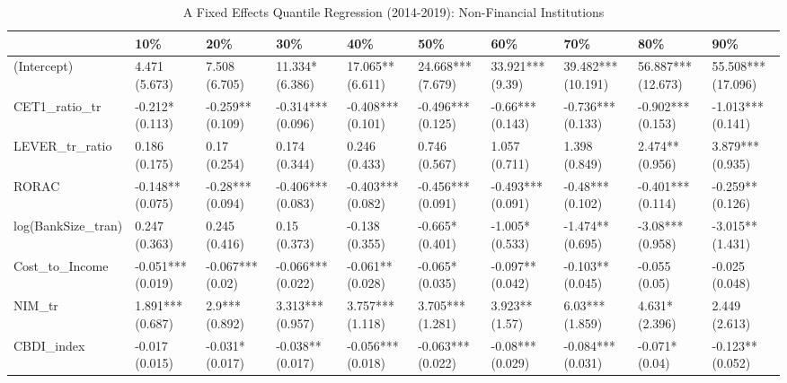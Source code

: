 \begin{table}[ht]
\centering
\caption{A Fixed Effects Quantile Regression (2014-2019): Non-Financial Institutions} 
\begingroup\small
\begin{tabular}{llllllllll}
  \toprule
 & 10\% & 20\% & 30\% & 40\% & 50\% & 60\% & 70\% & 80\% & 90\% \\ 
  \midrule
(Intercept) & 4.471 (5.673) & 7.508 (6.705) & 11.334* (6.386) & 17.065** (6.611) & 24.668*** (7.679) & 33.921*** (9.39) & 39.482*** (10.191) & 56.887*** (12.673) & 55.508*** (17.096) \\ 
  CET1\_ratio\_tr & -0.212* (0.113) & -0.259** (0.109) & -0.314*** (0.096) & -0.408*** (0.101) & -0.496*** (0.125) & -0.66*** (0.143) & -0.736*** (0.133) & -0.902*** (0.153) & -1.013*** (0.141) \\ 
  LEVER\_tr\_ratio & 0.186 (0.175) & 0.17 (0.254) & 0.174 (0.344) & 0.246 (0.433) & 0.746 (0.567) & 1.057 (0.711) & 1.398 (0.849) & 2.474** (0.956) & 3.879*** (0.935) \\ 
  RORAC & -0.148** (0.075) & -0.28*** (0.094) & -0.406*** (0.083) & -0.403*** (0.082) & -0.456*** (0.091) & -0.493*** (0.091) & -0.48*** (0.102) & -0.401*** (0.114) & -0.259** (0.126) \\ 
  log(BankSize\_tran) & 0.247 (0.363) & 0.245 (0.416) & 0.15 (0.373) & -0.138 (0.355) & -0.665* (0.401) & -1.005* (0.533) & -1.474** (0.695) & -3.08*** (0.958) & -3.015** (1.431) \\ 
  Cost\_to\_Income & -0.051*** (0.019) & -0.067*** (0.02) & -0.066*** (0.022) & -0.061** (0.028) & -0.065* (0.035) & -0.097** (0.042) & -0.103** (0.045) & -0.055 (0.05) & -0.025 (0.048) \\ 
  NIM\_tr & 1.891*** (0.687) & 2.9*** (0.892) & 3.313*** (0.957) & 3.757*** (1.118) & 3.705*** (1.281) & 3.923** (1.57) & 6.03*** (1.859) & 4.631* (2.396) & 2.449 (2.613) \\ 
  CBDI\_index & -0.017 (0.015) & -0.031* (0.017) & -0.038** (0.017) & -0.056*** (0.018) & -0.063*** (0.022) & -0.08*** (0.029) & -0.084*** (0.031) & -0.071* (0.04) & -0.123** (0.052) \\ 
   \bottomrule
\end{tabular}
\endgroup
\end{table}
